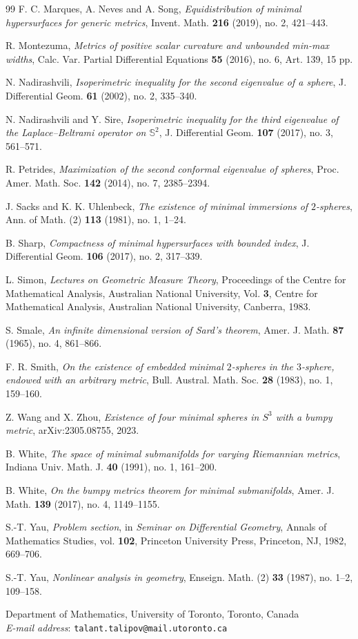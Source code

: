 \documentclass[12pt,english]{amsart}
\theoremstyle{definition}
\begin{document}
\begin{thebibliography}{99}
F. C. Marques, A. Neves and A. Song,
\emph{Equidistribution of minimal hypersurfaces for generic metrics},
Invent. Math. \textbf{216} (2019), no. 2, 421--443.

R. Montezuma,
\emph{Metrics of positive scalar curvature and unbounded min-max widths},
Calc. Var. Partial Differential Equations \textbf{55} (2016), no. 6, Art. 139, 15 pp.

N. Nadirashvili,
\emph{Isoperimetric inequality for the second eigenvalue of a sphere},
J. Differential Geom. \textbf{61} (2002), no. 2, 335--340.

N. Nadirashvili and Y. Sire,
\emph{Isoperimetric inequality for the third eigenvalue of the Laplace--Beltrami operator on \(\mathbb S^2\)},
J. Differential Geom. \textbf{107} (2017), no. 3, 561--571.

R. Petrides,
\emph{Maximization of the second conformal eigenvalue of spheres},
Proc. Amer. Math. Soc. \textbf{142} (2014), no. 7, 2385--2394.

J. Sacks and K. K. Uhlenbeck,
\emph{The existence of minimal immersions of \(2\)-spheres},
Ann. of Math. (2) \textbf{113} (1981), no. 1, 1--24.

B. Sharp,
\emph{Compactness of minimal hypersurfaces with bounded index},
J. Differential Geom. \textbf{106} (2017), no. 2, 317--339.

L. Simon,
\emph{Lectures on Geometric Measure Theory},
Proceedings of the Centre for Mathematical Analysis, Australian National University,
Vol. \textbf{3}, Centre for Mathematical Analysis, Australian National University,
Canberra, 1983.

S. Smale,
\emph{An infinite dimensional version of Sard's theorem},
Amer. J. Math. \textbf{87} (1965), no. 4, 861--866.

F. R. Smith,
\emph{On the existence of embedded minimal \(2\)-spheres in the \(3\)-sphere, endowed with an arbitrary metric},
Bull. Austral. Math. Soc. \textbf{28} (1983), no. 1, 159--160.

Z. Wang and X. Zhou,
\emph{Existence of four minimal spheres in \(S^3\) with a bumpy metric},
arXiv:2305.08755, 2023.

B. White,
\emph{The space of minimal submanifolds for varying Riemannian metrics},
Indiana Univ. Math. J. \textbf{40} (1991), no. 1, 161--200.

B. White,
\emph{On the bumpy metrics theorem for minimal submanifolds},
Amer. J. Math. \textbf{139} (2017), no. 4, 1149--1155.

S.-T. Yau,
\emph{Problem section},
in \emph{Seminar on Differential Geometry},
Annals of Mathematics Studies, vol. \textbf{102},
Princeton University Press, Princeton, NJ, 1982, 669--706.

S.-T. Yau,
\emph{Nonlinear analysis in geometry},
Enseign. Math. (2) \textbf{33} (1987), no. 1--2, 109--158.

\end{thebibliography}
\vspace{0.5cm} %
\noindent Department of Mathematics, University of Toronto, Toronto, Canada\\
\textit{E-mail address}: \texttt{talant.talipov@mail.utoronto.ca}
\end{document}
